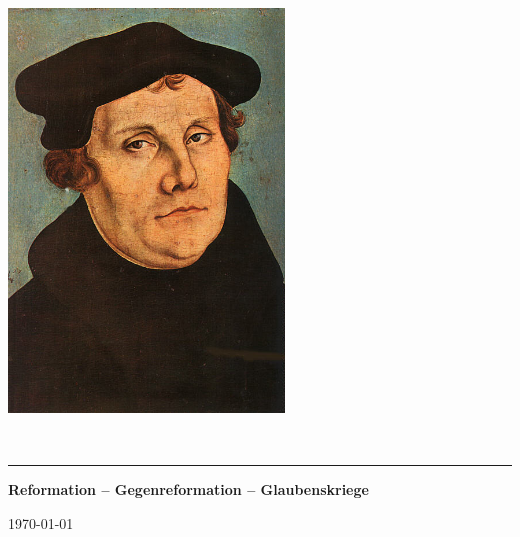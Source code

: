 \documentclass[11pt,a4paper]{article}
\def\firstname{Pascal}
\def\familyname{Bernhard}
\begin{document}
\sffamily   %
\hfill%
\begin{minipage}[t]{.6\textwidth}
\raggedleft%
\includegraphics[width=0.55\textwidth]{Martin_Luther.jpg}


\end{minipage}\\[0.5em]
%
{\color{firstnamecolor}\rule{\textwidth}{.25ex}}
%
\begin{minipage}[t]{.4\textwidth}
	\raggedright%
	\vspace*{1em}
	\textbf{Reformation -- Gegenreformation -- Glaubenskriege} \\
	\small%
\end{minipage}
%
\hfill
%
\begin{minipage}[t]{.4\textwidth}
	\raggedleft %
	\today
\end{minipage}\\[2.2em]
\end{document}
